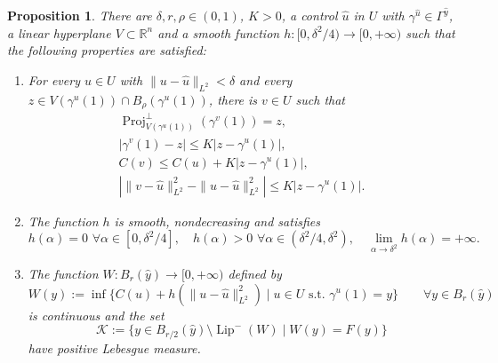 \documentclass[JEP,XML,SOM,Unicode,NoFloatCountersInSection,published]{cedram}
\newenvironment{enumeratei}
{\bgroup\def\theenumi{\roman{enumi}}\def\theenumii{\arabic{enumii}}\begin{enumerate}}
{\end{enumerate}\egroup}
\let\sep\mid
\DeclareMathOperator{\Lip}{Lip}
\DeclareMathOperator{\Proj}{Proj}
\newcommand\R{\mathbb R}
\newtheorem{proposition}[theorem]{Proposition}
\theoremstyle{definition}
\begin{document}
\begin{proposition}\label{PROPSTEP2}
There are $\delta, r, \rho \in (0,1)$, $K>0$, a control $\hat{u}$ in $U$ with $\gamma^{\hat{u}}\in \Gamma^{\hat{y}}$, a linear hyperplane $V\subset \R^n$ and a smooth function $h:[0,\delta^2/4) \to [0,+\infty)$ such that the following properties are satisfied:
\begin{enumeratei}
\item\label{PROPSTEP2i}
For every $u\in U$ with $\|u-\hat{u}\|_{L^2} < \delta$ and every $z\in V(\gamma^u(1)) \cap B_{\rho}(\gamma^u(1))$, there is $v \in U$ such that
\begin{gather}\label{PROPSTEP2_1}
\Proj_{V(\gamma^u(1))}^{\perp} \left(\gamma^{v}(1)\right)=z,
\\
\label{PROPSTEP2_2}
\left| \gamma^v(1)-z \right| \leq K | z-\gamma^u(1)|,
\\
\label{PROPSTEP2_3}
C(v) \leq C(u) + K \left|z - \gamma^u(1)\right|,
\\
\label{PROPSTEP2_4}
\left| \| v-\hat{u}\|_{L^2}^2 - \| u-\hat{u}\|_{L^2}^2 \right| \leq K | z-\gamma^u(1)|.
\end{gather}
\item\label{PROPSTEP2ii}
The function $h$ is smooth, nondecreasing and satisfies
\[
h(\alpha) = 0 \, \, \forall \alpha \in [0,\delta^2/4], \quad h(\alpha) > 0 \, \,\forall \alpha \in (\delta^2/4,\delta^2), \quad \lim_{\alpha \to \delta^2} h(\alpha)= +\infty.
\]
\item\label{PROPSTEP2iii}
The function $W: B_r(\hat{y}) \to [0,+\infty)$ defined by
\[
W(y) := \inf \bigl\{ C(u) + h\left(\|u-\hat{u}\|_{L^2}^2\right) \sep  u \in U \text{ s.t. } \gamma^{u}(1)=y \bigr\} \qquad \forall y \in B_r(\hat{y}) 
\]
is continuous and the set
\[
\mathcal{K} := \bigl\{y\in B_{r/2}(\hat{y})\setminus \Lip^-(W)\sep  W(y)=F(y) \bigr\}
\]
have positive Lebesgue measure.
\end{enumeratei}
\end{proposition}
\end{document}
